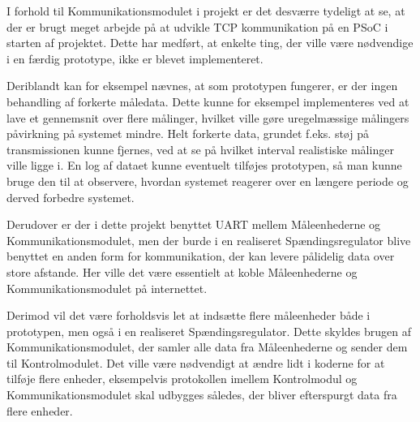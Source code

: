 
I forhold til Kommunikationsmodulet i projekt er det desværre tydeligt at se, at der er brugt meget arbejde på at udvikle TCP kommunikation på en PSoC i starten af projektet. Dette har medført, at enkelte ting, der ville være nødvendige i en færdig prototype, ikke er blevet implementeret.

Deriblandt kan for eksempel nævnes, at som prototypen fungerer, er der ingen behandling af forkerte måledata. Dette kunne for eksempel implementeres ved at lave et gennemsnit over flere målinger, hvilket ville gøre uregelmæssige målingers påvirkning på systemet mindre. Helt forkerte data, grundet f.eks. støj på transmissionen kunne fjernes, ved at se på hvilket interval realistiske målinger ville ligge i. En log af dataet kunne eventuelt tilføjes prototypen, så man kunne bruge den til at observere, hvordan systemet reagerer over en længere periode og derved forbedre systemet.

Derudover er der i dette projekt benyttet UART mellem Måleenhederne og Kommunikationsmodulet, men der burde i en realiseret Spændingsregulator blive benyttet en anden form for kommunikation, der kan levere pålidelig data over store afstande. Her ville det være essentielt at koble Måleenhederne og Kommunikationsmodulet på internettet.

Derimod vil det være forholdsvis let at indsætte flere måleenheder både i prototypen, men også i en realiseret Spændingsregulator. Dette skyldes brugen af Kommunikationsmodulet, der samler alle data fra Måleenhederne og sender dem til Kontrolmodulet. Det ville være nødvendigt at ændre lidt i koderne for at tilføje flere enheder, eksempelvis protokollen imellem Kontrolmodul og Kommunikationsmodulet skal udbygges således, der bliver efterspurgt data fra flere enheder.


